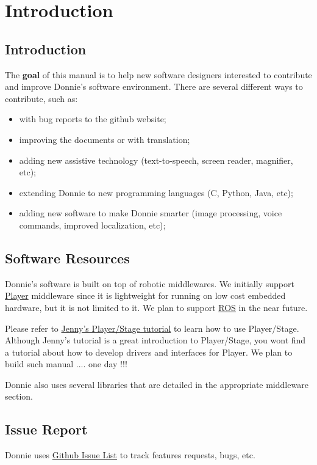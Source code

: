 \chapter{Introduction}

\section{Introduction}
\label{sec:intro}

The {\bf goal} of this manual is to help new software designers interested to contribute and improve Donnie's software environment. There are several different ways to contribute, such as:

\begin{itemize}
\item with bug reports to the github website;
\item improving the documents or with translation;
\item adding new assistive technology (text-to-speech, screen reader, magnifier, etc);
\item extending Donnie to new programming languages (C, Python, Java, etc);
\item adding new software to make Donnie smarter (image processing, voice commands, improved localization, etc);
\end{itemize}

\section{Software Resources}

Donnie's software is built on top of robotic middlewares. We initially support \href{http://playerstage.sourceforge.net/}{Player} middleware since it is lightweight for running on low cost embedded hardware, but it is not limited to it. We plan to support \href{http://www.ros.org/}{ROS} in the near future.

Please refer to \href{https://github.com/jennyhasahat/Player-Stage-Manual}{Jenny's Player/Stage tutorial} to learn how to use Player/Stage. Although Jenny's tutorial is a great introduction to Player/Stage, you wont find a tutorial about how to develop drivers and interfaces for Player. We plan to build such manual .... one day !!!

Donnie also uses several libraries that are detailed in the appropriate middleware section.


\section{Issue Report}

Donnie uses \href{https://github.com/lsa-pucrs/donnie-assistive-robot-sw/issues}{Github Issue List} to track features requests, bugs, etc.

